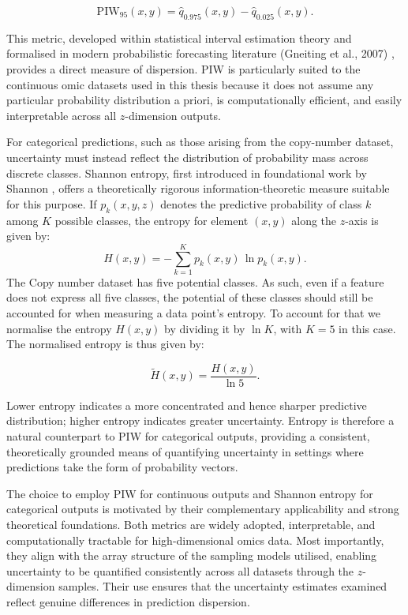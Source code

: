 \begin{equation}
\mathrm{PIW}_{95}(x,y) = \hat{q}_{0.975}(x,y) - \hat{q}_{0.025}(x,y).
\end{equation}

This metric, developed within statistical interval estimation theory \citep{Winkler1972} and formalised in modern probabilistic forecasting literature (Gneiting et al., 2007) \citep{Gneiting2007Calibration}, provides a direct measure of dispersion. PIW is particularly suited to the continuous omic datasets used in this thesis because it does not assume any particular probability distribution a priori, is computationally efficient, and easily interpretable across all $z$-dimension outputs.

For categorical predictions, such as those arising from the copy-number dataset, uncertainty must instead reflect the distribution of probability mass across discrete classes. Shannon entropy, first introduced in foundational work by Shannon \citep{Shannon1948}, offers a theoretically rigorous information-theoretic measure suitable for this purpose. If $p_k(x,y,z)$ denotes the predictive probability of class $k$ among $K$ possible classes, the entropy for element $(x, y)$ along the $z$-axis is given by:
\begin{equation}
H(x,y) = -\sum_{k=1}^{K} p_k(x,y)\,\ln p_k(x,y).
\end{equation}
The Copy number dataset has five potential classes. As such, even if a feature does not express all five classes, the potential of these classes should still be accounted for when measuring a data point's entropy. To account for that we normalise the entropy \(H(x,y)\) by dividing it by \(\ln K\), with \(K=5\) in this case. The normalised entropy is thus given by:

\begin{equation}
\widetilde{H}(x,y) = \frac{H(x,y)}{\ln 5}.
\end{equation}

Lower entropy indicates a more concentrated and hence sharper predictive distribution; higher entropy indicates greater uncertainty. Entropy is therefore a natural counterpart to PIW for categorical outputs, providing a consistent, theoretically grounded means of quantifying uncertainty in settings where predictions take the form of probability vectors.

The choice to employ PIW for continuous outputs and Shannon entropy for categorical outputs is motivated by their complementary applicability and strong theoretical foundations. Both metrics are widely adopted, interpretable, and computationally tractable for high-dimensional omics data. Most importantly, they align with the array structure of the sampling models utilised, enabling uncertainty to be quantified consistently across all datasets  through the $z$-dimension samples. Their use ensures that the uncertainty estimates examined reflect genuine differences in prediction dispersion.

